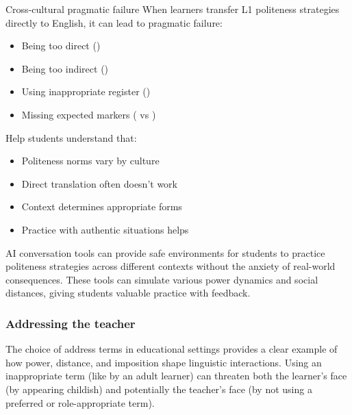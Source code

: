 \begin{tblsframed}{Cross-cultural pragmatic failure}
When learners transfer L1 politeness strategies directly to English, it can lead to pragmatic failure:
\begin{itemize}[noitemsep, leftmargin=*]
    \item Being too direct ()
    \item Being too indirect ()
    \item Using inappropriate register ()
    \item Missing expected markers ( vs )
\end{itemize}

\indent Help students understand that:
\begin{itemize}[noitemsep, leftmargin=*]
    \item Politeness norms vary by culture
    \item Direct translation often doesn't work
    \item Context determines appropriate forms
    \item Practice with authentic situations helps
\end{itemize}

\indent AI conversation tools can provide safe environments for students to practice politeness strategies across different contexts without the anxiety of real-world consequences. These tools can simulate various power dynamics and social distances, giving students valuable practice with feedback.
\end{tblsframed}

\subsubsection*{Addressing the teacher}

The choice of address terms in educational settings provides a clear example of how power, distance, and imposition shape linguistic interactions. Using an inappropriate term (like  by an adult learner) can threaten both the learner's face (by appearing childish) and potentially the teacher's face (by not using a preferred or role-appropriate term).


